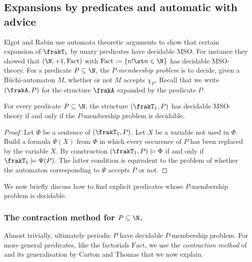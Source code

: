 \subsection{Expansions by predicates and automatic with advice}

 
Elgot and Rabin \cite{ElRa66} use automata theoretic arguments to show that certain expansion of $\frakT_1$ by unary
predicates have decidable MSO.  For instance they showed that $(\N,+1,\textrm{Fact})$
with $\textrm{Fact} := \{n! \st n \in \N\}$ has decidable MSO-theory.  For a predicate $P \subseteq \N$, the {\em $P$-membership problem} is to decide, given a B\"uchi-automaton $M$,  whether or not $M$ accepts $\chi_P$. Recall that we write $(\frakA,P)$ for the structure $\frakA$ expanded by the predicate $P$.

\begin{lemma} \cite{ElRa66}
For every predicate $P \subseteq \N$, the structure $(\frakT_1,P)$ has decidable
MSO-theory if and only if the $P$-membership problem is decidable.
\end{lemma}

\begin{proof}
Let $\Phi$ be a sentence of $(\frakT_1,P)$. Let $X$ be a
variable not used in $\Phi$.  Build a formula $\Psi(X)$ from $\Phi$ in which
every occurence of $P$ has been replaced by the variable $X$.  By construction
$(\frakT_1,P) \models \Phi$ if and only if $\frakT_1 \models \Psi(P)$.  The
latter condition is equivalent to the problem of whether the automaton
corresponding to $\Psi$ accepts $P$ or not.
\end{proof}

We now briefly discuss how to find explicit predicates whose $P$-membership problem is decidable.

\subsubsection*{The contraction method for $P \subseteq \N$.}
Almost trivially, ultimately periodic $P$ have decidable $P$-membership problem.
For more general predicates, like the factorials $\mathrm{Fact}$, we use the {\em contraction method} of \cite{ElRa66}
and its generalisation by Carton and Thomas \cite{CaTo02} that we now explain.

